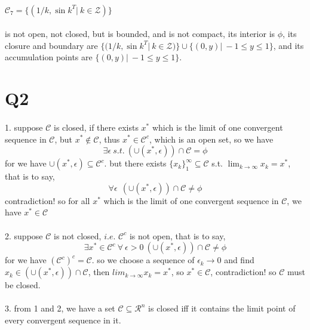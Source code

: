 \documentclass{article}
\begin{document}
  \paragraph{$\mathcal{C}_7 = \{(1 / k, \sin{k}^T|\ k \in \mathcal{Z})\}$}
    is not open, not closed, but is bounded, and is not compact, its interior is $\phi$, its closure and boundary are $\{(1 / k, \sin{k}^T|\ k \in \mathcal{Z})\} \cup \{(0, y)|\ -1 \leq y \leq 1\}$, and its accumulation points are $\{(0, y)|\ -1 \leq y \leq 1\}$.

\section{Q2}
  \paragraph{}
    1. suppose $\mathcal{C}$ is closed, if there exists $x^*$ which is the limit of one convergent sequence in $\mathcal{C}$, but $x^* \not\in \mathcal{C}$, thus $x^* \in \mathcal{C}^c$, which is an open set, so we have
    \begin{equation}
      \exists \epsilon\ s.t.\ (\cup(x^*, \epsilon)) \cap \mathcal{C} = \phi
    \end{equation}
    for we have $\cup(x^*, \epsilon) \subseteq \mathcal{C}^c$. but there exists $\{x_k\}_1^{\infty} \subseteq \mathcal{C}$ s.t. $\lim_{k \to \infty} x_k = x^*$, that is to say,
    \begin{equation}
      \forall \epsilon\ \ (\cup(x^*, \epsilon)) \cap \mathcal{C} \not= \phi
    \end{equation}
    contradiction! so for all $x^*$ which is the limit of one convergent sequence in $\mathcal{C}$, we have $x^* \in \mathcal{C}$
    \paragraph{}
      2. suppose $\mathcal{C}$ is not closed, $i.e.$ $\mathcal{C}^c$ is not open, that is to say,
      \begin{equation}
        \exists x^* \in \mathcal{C}^c\ \forall\ \epsilon > 0\ (\cup(x^*, \epsilon)) \cap \mathcal{C} \not= \phi
      \end{equation}
      for we have $(\mathcal{C}^c)^c = \mathcal{C}$. so we choose a sequence of $\epsilon_k \to 0$ and find $x_k \in (\cup(x^*, \epsilon)) \cap \mathcal{C}$, then $lim_{k \to \infty} x_k = x^*$, so $x^* \in \mathcal{C}$, contradiction! so $\mathcal{C}$ must be closed.
    \paragraph{}
      3. from 1 and 2, we have a set $\mathcal{C} \subseteq \mathcal{R}^n$ is closed iff it contains the limit point of every convergent sequence in it.
\end{document}
